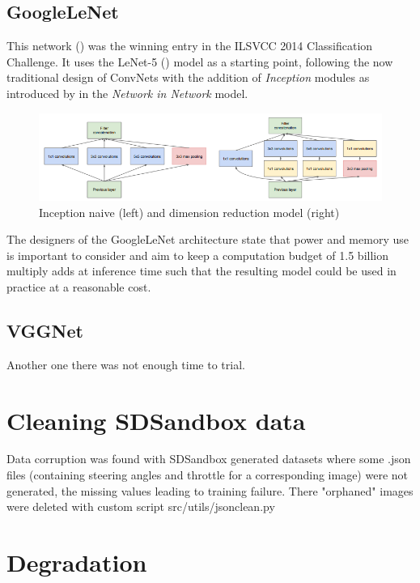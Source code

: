 \subsection{GoogleLeNet}

This network (\cite{szegedy2014going}) was the winning entry in the ILSVCC 2014 Classification Challenge. It uses the LeNet-5 (\cite{Lecun98gradient-basedlearning}) model as a starting point, following the now traditional design of ConvNets with the addition of \textit{Inception} modules as introduced by \cite{lin2013network} in the \textit{Network in Network} model.

\begin{figure}[ht]
 \centering 
 \includegraphics[width=\columnwidth]{Figures/InceptionModules.png}
 \caption{Inception naive (left) and dimension reduction model (right)}
 \label{fig:inception_modules}
\end{figure}

The designers of the GoogleLeNet architecture state that power and memory use is important to consider and aim to keep a computation budget of 1.5 billion multiply adds at inference time such that the resulting model could be used in practice at a reasonable cost.

\subsection{VGGNet}
Another one there was not enough time to trial.

\section{Cleaning SDSandbox data}

Data corruption was found with SDSandbox generated datasets where some .json files (containing steering angles and throttle for a corresponding image)  were not generated, the missing values leading to training failure. There "orphaned" images were deleted with custom script src/utils/jsonclean.py

\section{Degradation}


